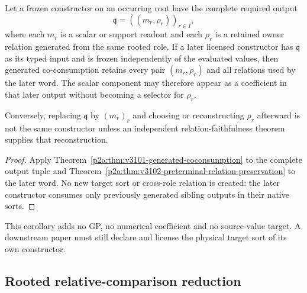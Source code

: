 \documentclass[12pt,a4paper]{article}
\begin{document}
\begin{corollary}
\label{p2a:cor:v3103-sibling-output-consumption}
Let a frozen constructor on an occurring root have the complete required
output
\[
 \mathfrak q=((m_r,\rho_r))_{r\in I},
\]
where each $m_r$ is a scalar or support readout and each $\rho_r$ is a retained
owner relation generated from the same rooted role.  If a later licensed
constructor has $\mathfrak q$ as its typed input and is frozen independently of
the evaluated values, then generated co-consumption retains every pair
$(m_r,\rho_r)$ and all relations used by the later word.  The scalar component
may therefore appear as a coefficient in that later output without becoming a
selector for $\rho_r$.

Conversely, replacing $\mathfrak q$ by $(m_r)_r$ and choosing or reconstructing
$\rho_r$ afterward is not the same constructor unless an independent
relation-faithfulness theorem supplies that reconstruction.
\end{corollary}

\begin{proof}
Apply Theorem~\ref{p2a:thm:v3101-generated-coconsumption} to the complete
output tuple and Theorem~\ref{p2a:thm:v3102-preterminal-relation-preservation}
to the later word.  No new target sort or cross-role relation is created: the
later constructor consumes only previously generated sibling outputs in their
native sorts.
\end{proof}

\begin{remark}
\label{p2a:rem:v3103-no-new-principle}
This corollary adds no GP, no numerical coefficient and no source-value target.
A downstream paper must still declare and license the physical target sort of
its own constructor.
\end{remark}


\subsection{Rooted relative-comparison reduction}
\label{p2a:sec:v3104-rooted-relative-comparison}
\end{document}

